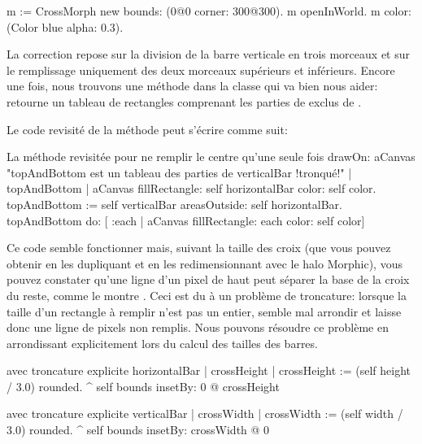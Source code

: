 \documentclass[a4paper,10pt,twoside]{book}
\begin{document}

\begin{code}{}
m := CrossMorph new bounds: (0@0 corner: 300@300).
m openInWorld.
m color: (Color blue alpha: 0.3).

\end{code}

\noindent
La correction repose sur la division de la barre verticale en trois
morceaux et sur le remplissage uniquement des deux morceaux
supérieurs et inférieurs.
Encore une fois, nous trouvons une méthode dans la classe
 qui va bien nous aider:  
retourne un tableau de rectangles comprenant les parties de 
exclus de . 

Le code revisité de la méthode  peut s'écrire comme suit:

\begin{method}{La méthode  revisitée pour ne remplir le centre qu'une seule fois}
drawOn: aCanvas 
    "topAndBottom est un tableau des parties de verticalBar !tronqué!"
	| topAndBottom |
	aCanvas fillRectangle: self horizontalBar color: self color.
	topAndBottom := self verticalBar areasOutside: self horizontalBar. 
	topAndBottom do: [ :each | aCanvas fillRectangle: each color: self color]
\end{method}

Ce code semble fonctionner mais, suivant la taille des croix 
(que vous pouvez obtenir en les dupliquant et en les redimensionnant
avec le halo Morphic), vous pouvez constater qu'une ligne d'un pixel
de haut peut séparer la base de la croix du reste, comme le montre
.
Ceci est du \`a un problème de troncature: %
lorsque la taille d'un rectangle \`a remplir n'est pas un entier,
 semble mal arrondir et laisse donc une
ligne de pixels non remplis.
Nous pouvons résoudre ce problème en arrondissant explicitement
lors du calcul des tailles des barres.

\begin{method}{ avec troncature explicite}
horizontalBar
	| crossHeight |
	crossHeight := (self height / 3.0) rounded.
	^ self bounds insetBy: 0 @ crossHeight
\end{method}

\begin{method}{ avec troncature explicite}
verticalBar
	| crossWidth |
	crossWidth := (self width / 3.0) rounded.
	^ self bounds insetBy: crossWidth @ 0
\end{method}
\end{document}
